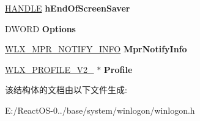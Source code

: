 \begin{DoxyCompactItemize}
\item 
\mbox{\label{struct___w_l_s_e_s_s_i_o_n_a72e8b67012c1f34ece9ca9e98bb9f16c}} 
\hyperlink{interfacevoid}{H\+A\+N\+D\+LE} {\bfseries h\+End\+Of\+Screen\+Saver}
\item 
\mbox{\label{struct___w_l_s_e_s_s_i_o_n_a5f931b24d74f864b87faa934b39c6fb2}} 
D\+W\+O\+RD {\bfseries Options}
\item 
\mbox{\label{struct___w_l_s_e_s_s_i_o_n_ac77dcd23927e8c45eb541c22877060a6}} 
\hyperlink{struct___w_l_x___m_p_r___n_o_t_i_f_y___i_n_f_o}{W\+L\+X\+\_\+\+M\+P\+R\+\_\+\+N\+O\+T\+I\+F\+Y\+\_\+\+I\+N\+FO} {\bfseries Mpr\+Notify\+Info}
\item 
\mbox{\label{struct___w_l_s_e_s_s_i_o_n_a29cf5330eb9b4490c040fa9afbecde1e}} 
\hyperlink{struct___w_l_x___p_r_o_f_i_l_e___v2__0}{W\+L\+X\+\_\+\+P\+R\+O\+F\+I\+L\+E\+\_\+\+V2\+\_} $\ast$ {\bfseries Profile}
\end{DoxyCompactItemize}


该结构体的文档由以下文件生成\+:\begin{DoxyCompactItemize}
\item 
E\+:/\+React\+O\+S-\/0../base/system/winlogon/winlogon.\+h\end{DoxyCompactItemize}
